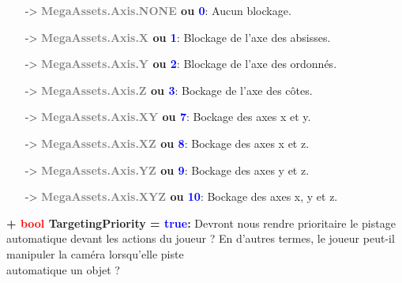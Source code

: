 \documentclass[a4paper, 11pt]{article}
\begin{document}
	\begin{itemize}
		\item [-> \textbf{\textcolor{gray}{MegaAssets.Axis.NONE} ou \textcolor{blue}{0}}:] Aucun blockage.
		\item [-> \textbf{\textcolor{gray}{MegaAssets.Axis.X} ou \textcolor{blue}{1}}:] Blockage de l'axe 
		des absisses.
		\item [-> \textbf{\textcolor{gray}{MegaAssets.Axis.Y} ou \textcolor{blue}{2}}:] Blockage de l'axe 
		des ordonnés.
		\item [-> \textbf{\textcolor{gray}{MegaAssets.Axis.Z} ou \textcolor{blue}{3}}:] Bockage de l'axe des 
		côtes.
		\item [-> \textbf{\textcolor{gray}{MegaAssets.Axis.XY} ou \textcolor{blue}{7}}:] Bockage des axes x 
		et y.
		\item [-> \textbf{\textcolor{gray}{MegaAssets.Axis.XZ} ou \textcolor{blue}{8}}:] Bockage des axes x 
		et z.
		\item [-> \textbf{\textcolor{gray}{MegaAssets.Axis.YZ} ou \textcolor{blue}{9}}:] Bockage des axes y 
		et z.
		\item [-> \textbf{\textcolor{gray}{MegaAssets.Axis.XYZ} ou \textcolor{blue}{10}}:] Bockage des axes 
		x, y et z.\\
	\end{itemize}
	\textbf{+ \textcolor{red}{bool} TargetingPriority = \textcolor{blue}{true}:} Devront nous rendre
	prioritaire le pistage automatique devant les actions du joueur ? En d'autres termes, le joueur peut-il 
	manipuler la caméra lorsqu'elle piste \\automatique un objet ?

\end{document}

